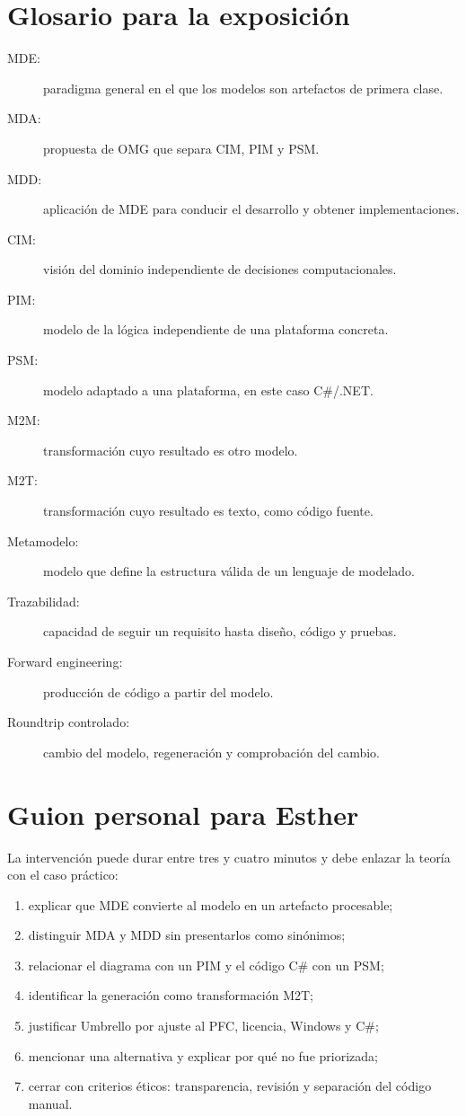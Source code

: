 \section{Glosario para la exposición}
\begin{description}
  \item[MDE:] paradigma general en el que los modelos son artefactos de primera clase.
  \item[MDA:] propuesta de OMG que separa CIM, PIM y PSM.
  \item[MDD:] aplicación de MDE para conducir el desarrollo y obtener implementaciones.
  \item[CIM:] visión del dominio independiente de decisiones computacionales.
  \item[PIM:] modelo de la lógica independiente de una plataforma concreta.
  \item[PSM:] modelo adaptado a una plataforma, en este caso C\#/.NET.
  \item[M2M:] transformación cuyo resultado es otro modelo.
  \item[M2T:] transformación cuyo resultado es texto, como código fuente.
  \item[Metamodelo:] modelo que define la estructura válida de un lenguaje de modelado.
  \item[Trazabilidad:] capacidad de seguir un requisito hasta diseño, código y pruebas.
  \item[Forward engineering:] producción de código a partir del modelo.
  \item[Roundtrip controlado:] cambio del modelo, regeneración y comprobación del cambio.
\end{description}

\section{Guion personal para Esther}
La intervención puede durar entre tres y cuatro minutos y debe enlazar la teoría con el caso práctico:
\begin{enumerate}
  \item explicar que MDE convierte al modelo en un artefacto procesable;
  \item distinguir MDA y MDD sin presentarlos como sinónimos;
  \item relacionar el diagrama con un PIM y el código C\# con un PSM;
  \item identificar la generación como transformación M2T;
  \item justificar Umbrello por ajuste al PFC, licencia, Windows y C\#;
  \item mencionar una alternativa y explicar por qué no fue priorizada;
  \item cerrar con criterios éticos: transparencia, revisión y separación del código manual.
\end{enumerate}

